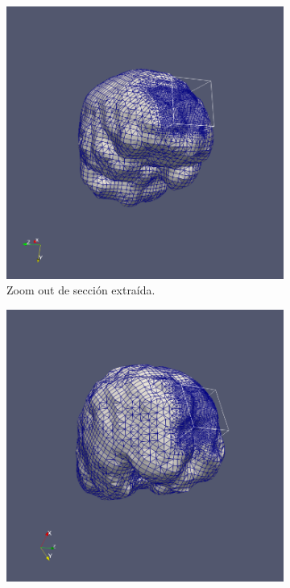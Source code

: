 \begin{figure}[!ht]
    \centering
    \begin{subfigure}[t]{0.45\textwidth}
        \includegraphics[width=1.0\textwidth]{figures/meshes/c_5r7_01.png}
        \caption{Zoom out de sección extraída.}
    \end{subfigure}
    \begin{subfigure}[t]{0.45\textwidth}
        \includegraphics[width=1.0\textwidth]{figures/meshes/c_5r7_2_01.png}

\end{subfigure}
\end{figure}

